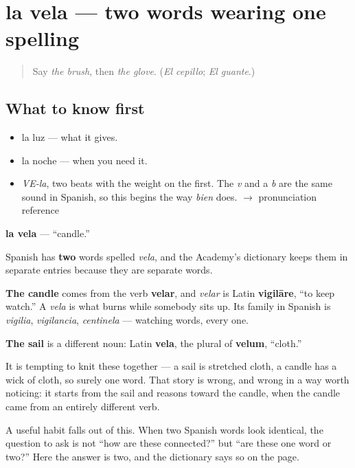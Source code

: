 \section[la vela]{la vela — two words wearing one spelling}

\label{lesson:ES-C374-vela}



\begin{quote}
Say \emph{the brush}, then \emph{the glove}. (\emph{El cepillo}; \emph{El guante}.)
\end{quote}

\subsection*{What to know first}
\begin{itemize}
\raggedright
  \item la luz — what it gives.
  \item la noche — when you need it.
\end{itemize}

\begin{sounds}
\begin{itemize}
\raggedright
  \item \emph{VE-la}, two beats with the weight on the first. The \emph{v} and a \emph{b} are the same sound in Spanish, so this begins the way \emph{bien} does. $\to$ pronunciation reference
\end{itemize}
\end{sounds}

\begin{cousinweb}
\textbf{la vela} — \textquotedblleft{}candle.\textquotedblright{}

Spanish has \textbf{two} words spelled \emph{vela}, and the Academy's dictionary keeps them in separate entries because they are separate words.

\textbf{The candle} comes from the verb \textbf{velar}, and \emph{velar} is Latin \textbf{vigilāre}, \textquotedblleft{}to keep watch.\textquotedblright{} A \emph{vela} is what burns while somebody sits up. Its family in Spanish is \emph{vigilia}, \emph{vigilancia}, \emph{centinela} — watching words, every one.

\textbf{The sail} is a different noun: Latin \textbf{vela}, the plural of \textbf{velum}, \textquotedblleft{}cloth.\textquotedblright{}

It is tempting to knit these together — a sail is stretched cloth, a candle has a wick of cloth, so surely one word. That story is wrong, and wrong in a way worth noticing: it starts from the sail and reasons toward the candle, when the candle came from an entirely different verb.

A useful habit falls out of this. When two Spanish words look identical, the question to ask is not \textquotedblleft{}how are these connected?\textquotedblright{} but \textquotedblleft{}are these one word or two?\textquotedblright{} Here the answer is two, and the dictionary says so on the page.
\end{cousinweb}

